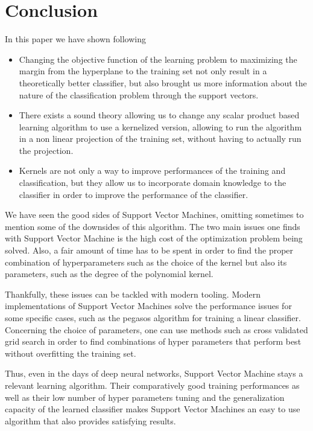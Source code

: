 \section{Conclusion}

In this paper we have shown following

\begin{itemize}
\item Changing the objective function of the learning problem to maximizing the margin from the hyperplane to the training set not only result in a theoretically better classifier, but also brought us more information about the nature of the classification problem through the support vectors.
\item There exists a sound theory allowing us to change any scalar product based learning algorithm to use a kernelized version, allowing to run the algorithm in a non linear projection of the training set, without having to actually run the projection.
\item Kernels are not only a way to improve performances of the training and classification, but they allow us to incorporate domain knowledge to the classifier in order to improve the performance of the classifier.
\end{itemize}

We have seen the good sides of Support Vector Machines, omitting sometimes to mention some of the downsides of this algorithm. The two main issues one finds with Support Vector Machine is the high cost of the optimization problem being solved. Also, a fair amount of time has to be spent in order to find the proper combination of hyperparameters such as the choice of the kernel but also its parameters, such as the degree of the polynomial kernel.

Thankfully, these issues can be tackled with modern tooling. Modern implementations of Support Vector Machines solve the performance issues for some specific cases, such as the pegasos algorithm \cite{Shalev-Shwartz:2007:PPE:1273496.1273598} for training a linear classifier. Concerning the choice of parameters, one can use methods such as cross validated grid search in order to find combinations of hyper parameters that perform best without overfitting the training set.

Thus, even in the days of deep neural networks, Support Vector Machine stays a relevant learning algorithm. Their comparatively good training performances as well as their low number of hyper parameters tuning and the generalization capacity of the learned classifier makes Support Vector Machines an easy to use algorithm that also provides satisfying results.


